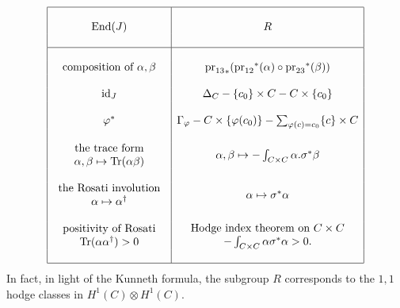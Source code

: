 $$
\begin{array}{|c|c|}
\hline 
& \\
\text{End}(J)  & R 
\\ & \\
\hline
& \\
\text{composition of $\alpha, \beta$} 
& 
{\text{pr}_{13}}_* ({\text{pr}_{12}}^*(\alpha) \circ {\text{pr}_{23}}^*(\beta)) 
\\ & \\
\text{id}_J 
& 
\Delta_C - \{c_0\} \times C - C \times \{c_0\}
\\ & \\
\varphi^* 
& 
\Gamma_\varphi - C \times \{\varphi(c_0)\} - \sum_{\varphi(c) = c_0} \{c\} \times C 
\\ & \\
{\begin{array}{c}
\text{the trace form} \\
\alpha, \beta \mapsto \text{Tr}(\alpha \beta)
\end{array}}
& 
\alpha, \beta \mapsto - \int_{C\times C} \alpha . \sigma^*\beta
\\ & \\
{\begin{array}{c}
\text{the Rosati involution} \\
\alpha \mapsto \alpha^\dagger
\end{array}}
&  
\alpha \mapsto \sigma^*\alpha
\\ & \\
{\begin{array}{c}
\text{positivity of Rosati} \\
\text{Tr}(\alpha\alpha^\dagger) > 0
\end{array}}
&  
{\begin{array}{c}
\text{Hodge index theorem on $C\times C$} \\
- \int_{C\times C} \alpha \sigma^*\alpha > 0.
\end{array}}
\\ & \\
\hline
\end{array}
$$
In fact, in light of the Kunneth formula, the subgroup $R$ corresponds to the $1,1$ hodge classes in $H^1(C)\otimes H^1(C)$.

